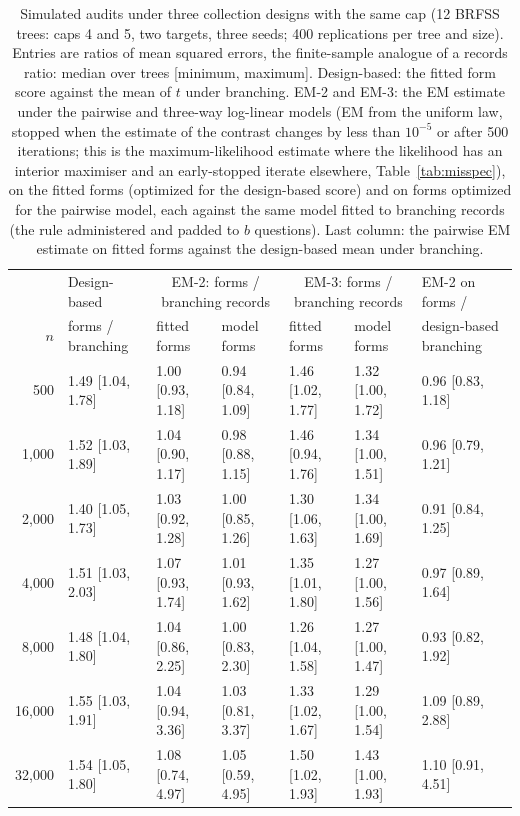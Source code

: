 \begin{table}[h]
\centering
\caption{Simulated audits under three collection designs with the same cap (12 BRFSS trees: caps 4 and 5, two targets, three seeds; 400 replications per tree and size). Entries are ratios of mean squared errors, the finite-sample analogue of a records ratio: median over trees [minimum, maximum]. Design-based: the fitted form score against the mean of $t$ under branching. EM-2 and EM-3: the EM estimate under the pairwise and three-way log-linear models (EM from the uniform law, stopped when the estimate of the contrast changes by less than $10^{-5}$ or after 500 iterations; this is the maximum-likelihood estimate where the likelihood has an interior maximiser and an early-stopped iterate elsewhere, Table~\ref{tab:misspec}), on the fitted forms (optimized for the design-based score) and on forms optimized for the pairwise model, each against the same model fitted to branching records (the rule administered and padded to $b$ questions). Last column: the pairwise EM estimate on fitted forms against the design-based mean under branching.}
\label{tab:curve}
\scriptsize
\setlength{\tabcolsep}{3pt}
\begin{tabular}{rllllll}
\toprule
 & Design-based & \multicolumn{2}{c}{EM-2: forms / branching records} & \multicolumn{2}{c}{EM-3: forms / branching records} & EM-2 on forms / \\
$n$ & forms / branching & fitted forms & model forms & fitted forms & model forms & design-based branching \\
\midrule
500 & 1.49 [1.04, 1.78] & 1.00 [0.93, 1.18] & 0.94 [0.84, 1.09] & 1.46 [1.02, 1.77] & 1.32 [1.00, 1.72] & 0.96 [0.83, 1.18] \\
1,000 & 1.52 [1.03, 1.89] & 1.04 [0.90, 1.17] & 0.98 [0.88, 1.15] & 1.46 [0.94, 1.76] & 1.34 [1.00, 1.51] & 0.96 [0.79, 1.21] \\
2,000 & 1.40 [1.05, 1.73] & 1.03 [0.92, 1.28] & 1.00 [0.85, 1.26] & 1.30 [1.06, 1.63] & 1.34 [1.00, 1.69] & 0.91 [0.84, 1.25] \\
4,000 & 1.51 [1.03, 2.03] & 1.07 [0.93, 1.74] & 1.01 [0.93, 1.62] & 1.35 [1.01, 1.80] & 1.27 [1.00, 1.56] & 0.97 [0.89, 1.64] \\
8,000 & 1.48 [1.04, 1.80] & 1.04 [0.86, 2.25] & 1.00 [0.83, 2.30] & 1.26 [1.04, 1.58] & 1.27 [1.00, 1.47] & 0.93 [0.82, 1.92] \\
16,000 & 1.55 [1.03, 1.91] & 1.04 [0.94, 3.36] & 1.03 [0.81, 3.37] & 1.33 [1.02, 1.67] & 1.29 [1.00, 1.54] & 1.09 [0.89, 2.88] \\
32,000 & 1.54 [1.05, 1.80] & 1.08 [0.74, 4.97] & 1.05 [0.59, 4.95] & 1.50 [1.02, 1.93] & 1.43 [1.00, 1.93] & 1.10 [0.91, 4.51] \\
\bottomrule
\end{tabular}
\end{table}
